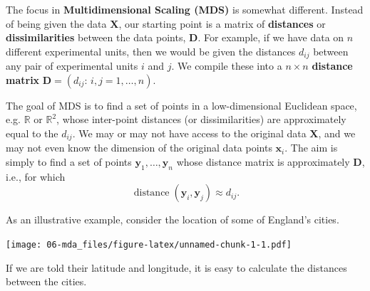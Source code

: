 \documentclass[]{book}
\theoremstyle{definition}
\theoremstyle{definition}
\theoremstyle{definition}
\theoremstyle{remark}
\begin{document}
The focus in \textbf{Multidimensional Scaling (MDS)} is somewhat different. Instead of being given the data \(\boldsymbol X\), our starting point is a matrix of \textbf{distances} or \textbf{dissimilarities} between the data points, \(\boldsymbol D\). For example, if we have data on \(n\) different experimental units, then we would be given the distances \(d_{ij}\) between any pair of experimental units \(i\) and \(j\). We compile these into a \(n\times n\) \textbf{distance matrix} \(\boldsymbol D=(d_{ij}: \, i,j=1, \ldots , n)\).

The goal of MDS is to find a set of points in a low-dimensional Euclidean space, e.g. \(\mathbb{R}\) or \(\mathbb{R}^2\), whose inter-point distances (or dissimilarities) are approximately equal to the \(d_{ij}\). We may or may not have access to the original data \(\boldsymbol X\), and we may not even know the dimension of the original data points \(\boldsymbol x_i\). The aim is simply to find a set of points \(\boldsymbol y_1, \ldots, \boldsymbol y_n\) whose distance matrix is approximately \(\boldsymbol D\), i.e., for which
\[\operatorname{distance}(\boldsymbol y_i, \boldsymbol y_j) \approx d_{ij}.\]

As an illustrative example, consider the location of some of England's cities.

\texttt{[image: 06-mda\_files/figure-latex/unnamed-chunk-1-1.pdf]}

If we are told their latitude and longitude, it is easy to calculate the distances between the cities.
\end{document}
